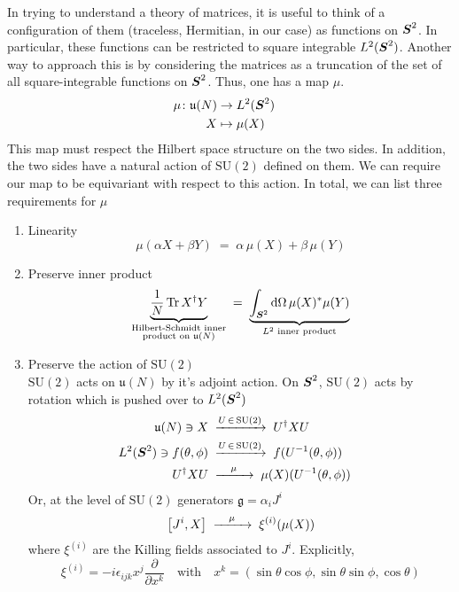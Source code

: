 In trying to understand a theory of matrices, it is useful to think of a configuration of them (traceless, Hermitian, in our case) as functions on $\boldsymbol{S}^2$. In particular, these functions can be restricted to square integrable $L^2(\boldsymbol{S}^2)$. Another way to approach this is by considering the matrices as a truncation of the set of all square-integrable functions on $\boldsymbol{S}^2$. Thus, one has a map $\mu$.
  \begin{align}
    \mu \colon \mathfrak{u}(N) &\to L^2(\boldsymbol{S}^2) \cr
    X &\mapsto \mu(X)
  \end{align}
  This map must respect the Hilbert space structure on the two sides. In addition, the two sides have a natural action of $\mathrm{SU}(2)$ defined on them. We can require our map to be equivariant with respect to this action. In total, we can list three requirements for $\mu$
  \begin{enumerate}
    \item Linearity
      \begin{equation}
        \mu(\alpha X + \beta Y) \; = \; \alpha \, \mu(X) + \beta \, \mu(Y)
      \end{equation}
    \item Preserve inner product
      \begin{equation}
        \underbrace{\frac{1}{N} \Tr X^\dagger Y}_{\substack{\text{Hilbert-Schmidt inner} \\ \text{product on }\mathfrak{u}(N)}} \; = \; \underbrace{\int_{\boldsymbol{S}^2} \text{d}\Omega \, \mu(X)^* \mu(Y)}_{L^2\text{ inner product}}
      \end{equation}
    \item Preserve the action of $\mathrm{SU}(2)$\\
      $\mathrm{SU}(2)$ acts on $\mathfrak{u}(N)$ by it's adjoint action. On $\boldsymbol{S}^2$, $\mathrm{SU}(2)$ acts by rotation which is pushed over to $L^2(\boldsymbol{S}^2)$
      \begin{align}
        \mathfrak{u}(N) \ni X \; &\xrightarrow{U \, \in \, \mathrm{SU}(2)} \; U^\dagger X U \cr
        L^2(\boldsymbol{S}^2) \ni f(\theta, \phi) \; &\xrightarrow{U \, \in \, \mathrm{SU}(2)} \; f(U^{-1} (\theta, \phi)) \cr
        U^\dagger X U \; &\xrightarrow{\quad\mu\quad} \; \mu(X)(U^{-1} (\theta, \phi))
      \end{align}
      Or, at the level of $\mathrm{SU}(2)$ generators $\mathfrak{g} = \alpha_i J^i$
      \begin{equation}
        \comm{J^i}{X} \; \xrightarrow{\quad\mu\quad} \; \xi^{(i)}(\mu(X))
      \end{equation}
      where $\xi^{(i)}$ are the Killing fields associated to $J^i$. Explicitly,
      \begin{equation}
        \xi^{(i)} = -i \epsilon_{i j k} x^j \frac{\partial}{\partial x^k} \quad \text{with} \quad x^k = (\sin \theta \cos \phi, \sin \theta \sin \phi, \cos \theta)
      \end{equation}
  \end{enumerate}

